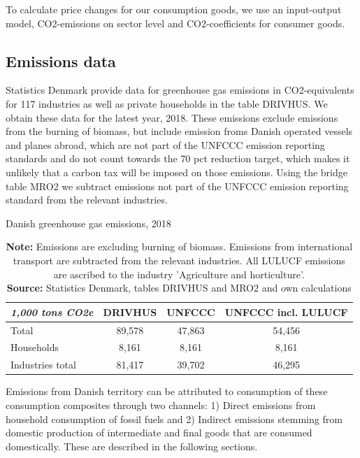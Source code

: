 To calculate price changes for our consumption goods, we use an input-output model, CO2-emissions on sector level and CO2-coefficients for consumer goods. 



\subsection{Emissions data}
Statistics Denmark provide data for greenhouse gas emissions in CO2-equivalents for 117 industries as well as private households in the table DRIVHUS. We obtain these data for the latest year, 2018. These emissions exclude emissions from the burning of biomass, but include emission froms Danish operated vessels and planes abroad, which are not part of the UNFCCC emission reporting standards and do not count towards the 70 pct reduction target, which makes it unlikely that a carbon tax will be imposed on those emissions. Using the bridge table MRO2 we subtract emissions not part of the UNFCCC emission reporting standard from the relevant industries.
\begin{table}[]
    \centering
    \caption{Danish greenhouse gas emissions, 2018}
    \begin{tabular}{lccc}
    
\textit{1,000 tons CO2e}    	        &DRIVHUS	& UNFCCC &	UNFCCC incl. LULUCF \\ \hline
Total	        &89,578	    & 47,863	     &54,456\\ \hline
Households	&8,161	    & 8,161	     &8,161\\
Industries total	&81,417	    & 39,702	     &46,295 \\ \hline
    \end{tabular}
    \label{emissions2018}
\captionsetup{singlelinecheck=off,size=scriptsize}
\setlength{\captionmargin}{10pt}
\caption*{
\textbf{Note:} Emissions are excluding burning of biomass. Emissions from international transport are subtracted from the relevant industries. All LULUCF emissions are ascribed to the industry 'Agriculture and horticulture'. \\ \textbf{Source:} Statistics Denmark, tables DRIVHUS and MRO2 and own calculations}
\end{table}
Emissions from Danish territory can be attributed to consumption of these consumption composites through two channels: 1) Direct emissions from household consumption of fossil fuels and 2) Indirect emissions stemming from domestic production of intermediate and final goods that are consumed domestically. These are described in the following sections.


